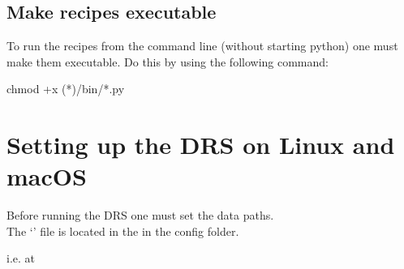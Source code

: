 \subsection{Make recipes executable}
\label{ch:install:installunix:executable}

\noindent To run the recipes from the command line (without starting python) one must make them executable. Do this by using the following command:
\begin{cmdbox}
chmod +x (*\InstallDIR*)/bin/*.py
\end{cmdbox}


\clearpage
\newpage
\section{Setting up the DRS on Linux and macOS}
\label{ch:install:setup}

Before running the DRS one must set the data paths. \\

\noindent The `\configtxtfile' file is located in the \InstallDIR in the config folder.

i.e. at  \\

